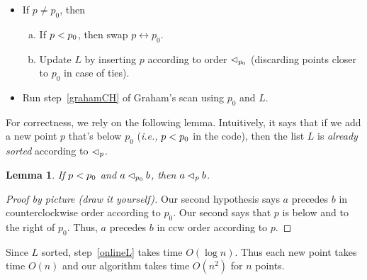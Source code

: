 \documentclass[a4paper]{article}
\newtheorem{mylemma}{\textbf{Lemma}}
\newcommand{\swap}{\leftrightarrow}
\newcommand{\ie}{\emph{i.e.,} }
\begin{document}
\begin{itemize}

	\item If $p \not= p_0$, then
	
	\begin{enumerate}[(a)]
		\item If $p < p_0$, then swap $p \swap p_0$.
		
		\item \label{onlineL} Update $L$ by inserting $p$ according to order $\lhd_{p_0}$ (discarding points closer to $p_0$ in case of ties).
		
	\end{enumerate}
	
	\item Run step~\eqref{grahamCH} of Graham's scan using $p_0$ and $L$.
	
\end{itemize}
For correctness, we rely on the following lemma.
Intuitively, it says that if we add a new point $p$ that's below $p_0$ (\ie $p < p_0$ in the code), then the list $L$ is \emph{already sorted} according to $\lhd_{p}$.

\begin{mylemma}
	If $p < p_0$ and $a \lhd_{p_0} b$, then $a \lhd_{p} b$.
\end{mylemma}

\begin{proof}[Proof by picture (draw it yourself)]
	Our second hypothesis says $a$ precedes $b$ in counterclockwise order according to $p_0$.
	Our second says that $p$ is below and to the right of $p_0$.
	Thus, $a$ precedes $b$ in ccw order according to $p$.
\end{proof}

Since $L$ sorted, step~\ref{onlineL} takes time $O(\log n)$.
Thus each new point takes time $O(n)$ and our algorithm takes time $O(n^2)$ for $n$ points.
\end{document}
